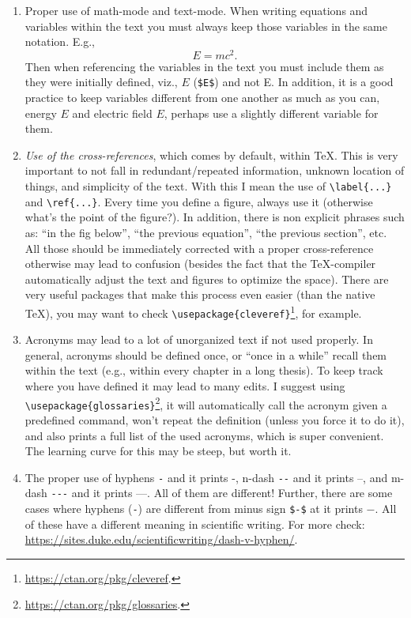 \begin{enumerate}

  \item Proper use of math-mode and text-mode. When writing equations and variables within the text you must always keep those variables in the same notation. E.g.,
  \begin{equation}
      E = mc^2.
  \end{equation}
  Then when referencing the variables in the text you must include them as they were initially defined, viz., $E$ (\verb|$E$|) and not E. In addition, it is a good practice to keep variables different from one another as much as you can, energy $E$ and electric field $E$, perhaps use a slightly different variable for them. 

  \item \textit{Use of the cross-references}, which comes by default, within \TeX. This is very important to not fall in redundant/repeated information, unknown location of things, and simplicity of the text. With this I mean the use of \verb|\label{...}| and \verb|\ref{...}|. Every time you define a figure, always use it (otherwise what's the point of the figure?). In addition, there is non explicit phrases such as: ``in the fig below'', ``the previous equation'', ``the previous section'', etc. All those should be immediately corrected with a proper cross-reference otherwise may lead to confusion (besides the fact that the \TeX-compiler automatically adjust the text and figures to optimize the space). There are very useful packages that make this process even easier (than the native \TeX), you may want to check \verb|\usepackage{cleveref}|\footnote{\url{https://ctan.org/pkg/cleveref}.}, for example.
  
  \item Acronyms may lead to a lot of unorganized text if not used properly. In general, acronyms should be defined once, or ``once in a while'' recall them within the text (e.g., within every chapter in a long thesis). To keep track where you have defined it may lead to many edits. I suggest using \verb|\usepackage{glossaries}|\footnote{\url{https://ctan.org/pkg/glossaries}.}, it will automatically call the acronym given a predefined command, won't repeat the definition (unless you force it to do it), and also prints a full list of the used acronyms, which is super convenient. The learning curve for this may be steep, but worth it.
  
  \item The proper use of hyphens \verb|-| and it prints -, n-dash \verb|--| and it prints --, and m-dash \verb|---| and it prints ---. All of them are different! Further, there are some cases where hyphens (\verb|-|) are different from minus sign \verb|$-$| at it prints $-$. All of these have a different meaning in scientific writing. For more check: \url{https://sites.duke.edu/scientificwriting/dash-v-hyphen/}.
  

\end{enumerate}
